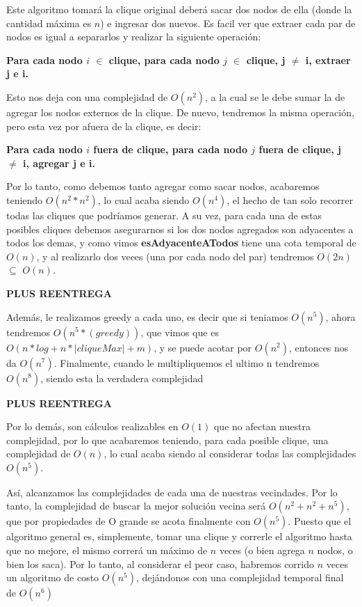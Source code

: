Este algoritmo tomará la clique original deberá sacar dos nodos de ella (donde la cantidad máxima es $n$) e ingresar dos nuevos. Es facil ver que extraer cada par de nodos es igual a separarlos y realizar la siguiente operación:

\textbf{Para cada nodo $i$ $\in$ clique, para cada nodo $j$ $\in$ clique, j $\neq$ i, extraer j e i.}

Esto nos deja con una complejidad de $O(n^2)$, a la cual se le debe sumar la de agregar los nodos externos de la clique. De nuevo, tendremos la misma operación, pero esta vez por afuera de la clique, es decir:

\textbf{Para cada nodo $i$ fuera de clique, para cada nodo $j$ fuera de  clique, j $\neq$ i, agregar j e i.}

Por lo tanto, como debemos tanto agregar como sacar nodos, acabaremos teniendo $O(n^2 * n^2)$, lo cual acaba siendo $O(n^4)$, el hecho de tan solo recorrer todas las cliques que podríamos generar. A su vez, para cada una de estas posibles cliques debemos asegurarnos si los dos nodos agregados son adyacentes a todos los demas, y como vimos \textbf{esAdyacenteATodos} tiene una cota temporal de $O(n)$, y al realizarlo dos veces (una por cada nodo del par) tendremos $O(2n)$ $\subseteq$ $O(n)$.	
\bigskip

\begin{center}
\textbf{PLUS REENTREGA}

Además, le realizamos greedy a cada uno, es decir que si teniamos $O(n^5)$, ahora tendremos $O(n^5 * (greedy))$, que vimos que es $O(n*log + n*|cliqueMax| + m)$, y se puede acotar por $O(n^2)$, entonces nos da $O(n^7)$. Finalmente, cuando le multipliquemos el ultimo n tendremos $O(n^8)$, siendo esta la verdadera complejidad

\textbf{PLUS REENTREGA}

\bigskip
\end{center}

Por lo demás, son cálculos realizables en $O(1)$ que no afectan nuestra complejidad, por lo que acabaremos teniendo, para cada posible clique, una complejidad de $O(n)$, lo cual acaba siendo al considerar todas las complejidades $O(n^5)$.
\bigskip

Así, alcanzamos las complejidades de cada una de nuestras vecindades. Por lo tanto, la complejidad de buscar la mejor solución vecina será $O(n^2 + n^2 + n^5)$, que por propiedades de O grande se acota finalmente con $O(n^5)$. Puesto que el algoritmo general es, simplemente, tomar una clique y correrle el algoritmo hasta que no mejore, el mismo correrá un máximo de $n$ veces (o bien agrega $n$ nodos, o bien los saca). Por lo tanto, al considerar el peor caso, habremos corrido $n$ veces un algoritmo de costo $O(n^5)$, dejándonos con una complejidad temporal final de $O(n^6)$

